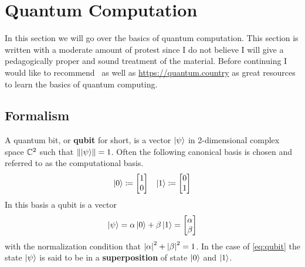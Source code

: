 
\section{Quantum Computation}

In this section we will go over the basics of quantum computation.
This section is written with a moderate amount of protest since I do not believe I will give a pedagogically proper and sound treatment of the material.
Before continuing I would like to recommend~\cite{nielsenchuang} as well as \url{https://quantum.country} as great resources to learn the basics of quantum computing.


\subsection{Formalism}

A quantum bit, or \textbf{qubit} for short, is a vector $\ket{\psi}$ in 2-dimensional complex space $\mathbb{C}^2$ such that $\norm{\ket{\psi}} = 1$.
Often the following canonical basis is chosen and referred to as the computational basis.
\begin{align}
    \ket{0} \defeq \mqty[1 \\ 0] & & \ket{1} \defeq \mqty[0 \\ 1]
\end{align}
In this basis a qubit is a vector
\begin{equation}\label{eq:qubit}
    \ket{\psi} = \alpha\ket{0} + \beta\ket{1} = \mqty[\alpha \\ \beta]
\end{equation}
with the normalization condition that $\abs{\alpha}^2 + \abs{\beta}^2 = 1$.
In the case of \cref{eq:qubit} the state $\ket{\psi}$ is said to be in a \textbf{superposition} of state $\ket{0}$ and $\ket{1}$.

